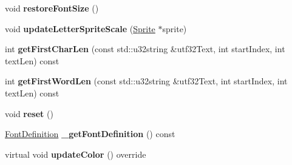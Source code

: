 \begin{DoxyCompactItemize}
\mbox{\label{classLabel_aa294274db49efae72c8b65e2dfa1940a}} 
void {\bfseries restore\+Font\+Size} ()
\item 
\mbox{\label{classLabel_a0d5de1294145561002c927b8639bf6dd}} 
void {\bfseries update\+Letter\+Sprite\+Scale} (\hyperlink{classSprite}{Sprite} $\ast$sprite)
\item 
\mbox{\label{classLabel_a7c7360f4f55376bdeb6afd6d01087146}} 
int {\bfseries get\+First\+Char\+Len} (const std\+::u32string \&utf32\+Text, int start\+Index, int text\+Len) const
\item 
\mbox{\label{classLabel_a77a88e916d42c5617f611eae9440fdba}} 
int {\bfseries get\+First\+Word\+Len} (const std\+::u32string \&utf32\+Text, int start\+Index, int text\+Len) const
\item 
\mbox{\label{classLabel_a6653f9b3efc57ca65e4c92b9eb6dbb46}} 
void {\bfseries reset} ()
\item 
\mbox{\label{classLabel_ad908702d3a30e4a4d808ce74ff804694}} 
\hyperlink{structFontDefinition}{Font\+Definition} {\bfseries \+\_\+get\+Font\+Definition} () const
\item 
\mbox{\label{classLabel_a9b4fdd874a7fec852030ee2891c40278}} 
virtual void {\bfseries update\+Color} () override
\end{DoxyCompactItemize}
